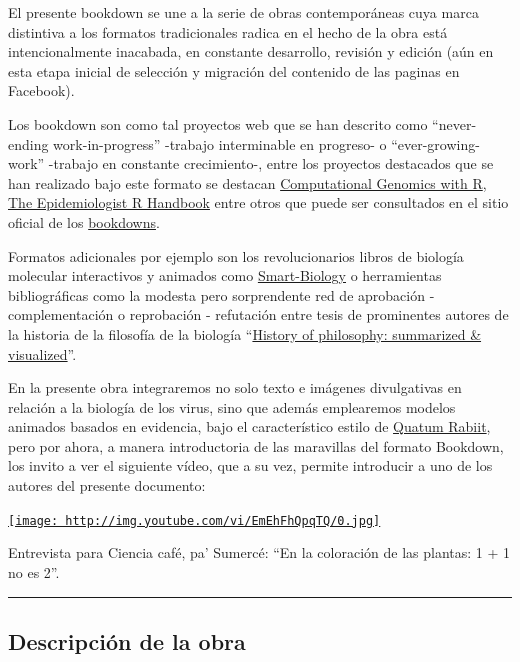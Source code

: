 \documentclass[
  12pt, krantz2,
  spanish,
]{krantz}
\begin{document}
El presente bookdown se une a la serie de obras contemporáneas cuya marca distintiva a los formatos tradicionales radica en el hecho de la obra está intencionalmente inacabada, en constante desarrollo, revisión y edición (aún en esta etapa inicial de selección y migración del contenido de las paginas en Facebook).

Los bookdown son como tal proyectos web que se han descrito como ``never-ending work-in-progress'' -trabajo interminable en progreso- o ``ever-growing-work'' -trabajo en constante crecimiento-, entre los proyectos destacados que se han realizado bajo este formato se destacan \href{https://compgenomr.github.io/book/}{Computational Genomics with R}, \href{https://epirhandbook.com/en/index.html}{The Epidemiologist R Handbook} entre otros que puede ser consultados en el sitio oficial de los \href{https://bookdown.org/home/archive/}{bookdowns}.

Formatos adicionales por ejemplo son los revolucionarios libros de biología molecular interactivos y animados como \href{https://www.smart-biology.com/}{Smart-Biology} o herramientas bibliográficas como la modesta pero sorprendente red de aprobación - complementación o reprobación - refutación entre tesis de prominentes autores de la historia de la filosofía de la biología
``\href{https://www.denizcemonduygu.com/philo/}{History of philosophy: summarized \& visualized}''.

En la presente obra integraremos no solo texto e imágenes divulgativas en relación a la biología de los virus, sino que además emplearemos modelos animados basados en evidencia, bajo el característico estilo de \href{https://www.facebook.com/Medicina88}{Quatum Rabiit}, pero por ahora, a manera introductoria de las maravillas del formato Bookdown, los invito a ver el siguiente vídeo, que a su vez, permite introducir a uno de los autores del presente documento:

\href{http://www.youtube.com/watch?v=EmEhFhQpqTQ}{\texttt{[image: http://img.youtube.com/vi/EmEhFhQpqTQ/0.jpg]}}

Entrevista para Ciencia café, pa' Sumercé: ``En la coloración de las plantas: 1 + 1 no es 2''.

\begin{center}\rule{0.5\linewidth}{0.5pt}\end{center}

\hypertarget{descripciuxf3n-de-la-obra}{%
\subsection*{Descripción de la obra}\label{descripciuxf3n-de-la-obra}}
\end{document}
